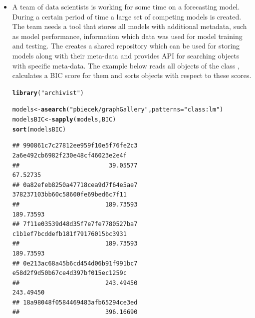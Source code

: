 \documentclass[nojss]{jss}\usepackage[]{graphicx}\usepackage[]{color}
\makeatletter
\newcommand{\hlstr}[1]{\textcolor[rgb]{0.192,0.494,0.8}{#1}}%
\newcommand{\hlstd}[1]{\textcolor[rgb]{0.345,0.345,0.345}{#1}}%
\newcommand{\hlkwb}[1]{\textcolor[rgb]{0.69,0.353,0.396}{#1}}%
\newcommand{\hlkwc}[1]{\textcolor[rgb]{0.333,0.667,0.333}{#1}}%
\newcommand{\hlkwd}[1]{\textcolor[rgb]{0.737,0.353,0.396}{\textbf{#1}}}%
\newenvironment{kframe}{%
 \def\at@end@of@kframe{}%
 \ifinner\ifhmode%
  \def\at@end@of@kframe{\end{minipage}}%
  \begin{minipage}{\columnwidth}%
 \fi\fi%
 \def\FrameCommand##1{\hskip\@totalleftmargin \hskip-\fboxsep
 \colorbox{shadecolor}{##1}\hskip-\fboxsep
     \hskip-\linewidth \hskip-\@totalleftmargin \hskip\columnwidth}%
 \MakeFramed {\advance\hsize-\width
   \@totalleftmargin\z@ \linewidth\hsize
   \@setminipage}}%
 {\par\unskip\endMakeFramed%
 \at@end@of@kframe}
\newenvironment{knitrout}{}{} %
\makeatother
\begin{document}
\begin{itemize}
\item A team of data scientists is working for some time on a forecasting model. During a certain period of time a large set of competing models is created. The team needs a tool that stores all models with additional metadata, such as model performance, information which data was used for model training and testing. The  creates a shared repository which can be used for storing models along with their meta-data and provides API for searching objects with specific meta-data. The example below reads all objects of the class , calculates a BIC score for them and sorts objects with respect to these scores.

\begin{knitrout}
\color{fgcolor}\begin{kframe}
\begin{alltt}
\hlkwd{library}\hlstd{(}\hlstr{"archivist"}\hlstd{)}
\end{alltt}


{\ttfamily\noindent\itshape\color{messagecolor}{\#\# Welcome to archivist (version: 2.1.3).}}\end{kframe}
\end{knitrout}
\begin{knitrout}
\color{fgcolor}\begin{kframe}
\begin{alltt}
\hlstd{models} \hlkwb{<-} \hlkwd{asearch}\hlstd{(}\hlstr{"pbiecek/graphGallery"}\hlstd{,} \hlkwc{patterns} \hlstd{=} \hlstr{"class:lm"}\hlstd{)}
\hlstd{modelsBIC} \hlkwb{<-} \hlkwd{sapply}\hlstd{(models, BIC)}
\hlkwd{sort}\hlstd{(modelsBIC)}
\end{alltt}
\begin{verbatim}
## 990861c7c27812ee959f10e5f76fe2c3 2a6e492cb6982f230e48cf46023e2e4f 
##                         39.05577                         67.52735 
## 0a82efeb8250a47718cea9d7f64e5ae7 378237103bb60c58600fe69bed6c7f11 
##                        189.73593                        189.73593 
## 7f11e03539d48d35f7e7fe7780527ba7 c1b1ef7bcddefb181f79176015bc3931 
##                        189.73593                        189.73593 
## 0e213ac68a45b6cd454d06b91f991bc7 e58d2f9d50b67ce4d397bf015ec1259c 
##                        243.49450                        243.49450 
## 18a98048f0584469483afb65294ce3ed 
##                        396.16690
\end{verbatim}
\end{kframe}
\end{knitrout}


\end{itemize}
\end{document}
